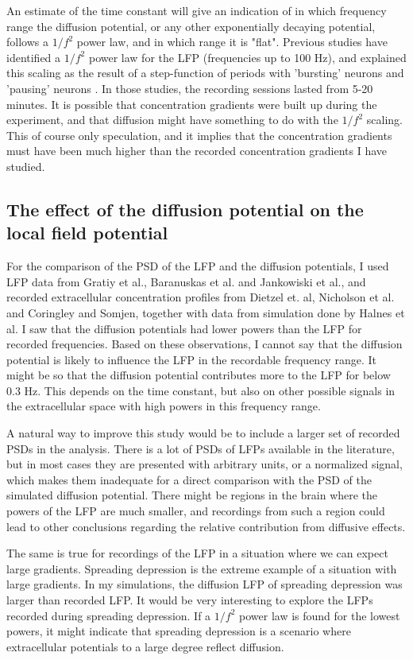 \documentclass{article}
\begin{document}
An estimate of the time constant will give an indication of in which frequency range the diffusion potential, or any other exponentially decaying potential, follows a $1/f^2$ power law, and in which range it is "flat". Previous studies have identified a  $1/f^2$ power law for the LFP (frequencies up to 100 Hz), and explained this scaling as the result of a step-function of periods with 'bursting' neurons and 'pausing' neurons \cite{Baranuskas2011}. In those studies, the recording sessions lasted from 5-20 minutes. It is possible that concentration gradients were built up during the experiment, and that diffusion might have something to do with the $1/f^2$ scaling. This of course only speculation, and it implies that the concentration gradients must have been much higher than the recorded concentration gradients I have studied. 

\subsection{The effect of the diffusion potential on the local field potential}
For the comparison of the PSD of the LFP and the diffusion potentials, I used LFP data from Gratiy et al., Baranuskas et al. and Jankowiski et al., and recorded extracellular concentration profiles from Dietzel et. al, Nicholson et al. and Coringley and Somjen, together with data from simulation done by Halnes et al. I saw that the diffusion potentials had lower powers than the LFP for recorded frequencies.  Based on these observations, I cannot say that the diffusion potential is likely to influence the LFP in the recordable frequency range. It might be so that the diffusion potential contributes more to the LFP for below 0.3 Hz. This depends on the time constant, but also on other possible signals in the extracellular space with high powers in this frequency range.

A natural way to improve this study would be to include a larger set of recorded PSDs in the analysis. There is a lot of PSDs of LFPs available in the literature, but in most cases they are presented with arbitrary units, or a normalized signal, which makes them inadequate for a direct comparison with the PSD of the simulated diffusion potential. There might be regions in the brain where the powers of the LFP are much smaller, and recordings from such a region could lead to other conclusions regarding the relative contribution from diffusive effects. 

The same is true for recordings of the LFP in a situation where we can expect large gradients. Spreading depression is the extreme  example of a situation with large gradients. In my simulations, the diffusion LFP of spreading depression was larger than recorded LFP. It would be very interesting to explore the LFPs recorded during spreading depression. If a $1/f^2$ power law is found for the lowest powers, it might indicate that spreading depression is a scenario where extracellular potentials to a large degree reflect diffusion.
\end{document}
